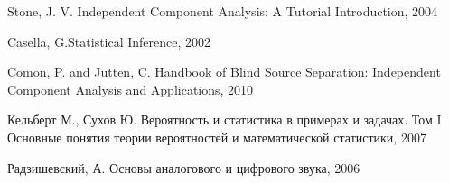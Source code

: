 \documentclass[a4paper,12pt]{article}
\begin{document}
	
	\clearpage
	\newpage
	\begin{thebibliography}{0}
		 Stone, J. V. Independent Component Analysis: A Tutorial Introduction, 2004
		
		 Casella, G.Statistical Inference, 2002
		
		 Comon, P. and Jutten, C. Handbook of Blind Source Separation: Independent Component Analysis and Applications, 2010
		
		 Кельберт М., Сухов Ю. Вероятность и статистика в примерах и задачах. Том I Основные понятия теории вероятностей и математической статистики, 2007		
		
		 Радзишевский, А. Основы аналогового и цифрового звука, 2006		
		
		
	\end{thebibliography}
	
	
\end{document}
